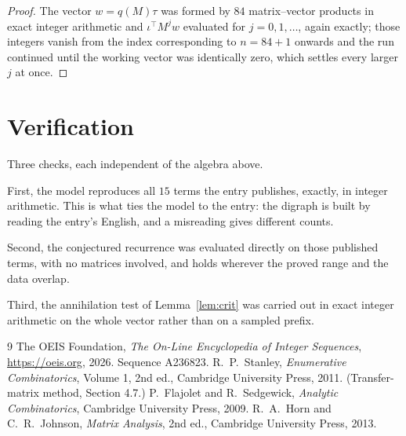 \documentclass[11pt,a4paper]{article}
\theoremstyle{plain}
\theoremstyle{definition}
\begin{document}
\begin{proof}
The vector $w=q(M)\tau$ was formed by $84$ matrix--vector products in exact integer
arithmetic and $\iota^{\!\top}M^{j}w$ evaluated for $j=0,1,\dots$, again exactly; those
integers vanish from the index corresponding to $n=84+1$ onwards and the run continued
until the working vector was identically zero, which settles every larger $j$ at once.
\end{proof}

\section{Verification}

Three checks, each independent of the algebra above.

First, the model reproduces all $15$ terms the entry publishes, exactly, in integer
arithmetic. This is what ties the model to the entry: the digraph is built by reading the
entry's English, and a misreading gives different counts.

Second, the conjectured recurrence was evaluated directly on those published terms, with no
matrices involved, and holds wherever the proved range and the data overlap.

Third, the annihilation test of Lemma~\ref{lem:crit} was carried out in exact integer
arithmetic on the whole vector rather than on a sampled prefix.

\begin{thebibliography}{9}
 The OEIS Foundation, \emph{The On-Line Encyclopedia of Integer
Sequences}, \url{https://oeis.org}, 2026. Sequence A236823.
 R.~P.~Stanley, \emph{Enumerative Combinatorics}, Volume 1, 2nd ed.,
Cambridge University Press, 2011. (Transfer-matrix method, Section 4.7.)
 P.~Flajolet and R.~Sedgewick, \emph{Analytic Combinatorics}, Cambridge
University Press, 2009.
 R.~A.~Horn and C.~R.~Johnson, \emph{Matrix Analysis}, 2nd ed., Cambridge
University Press, 2013.
\end{thebibliography}
\end{document}
